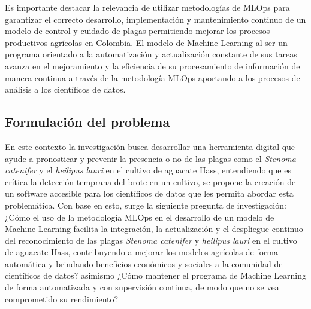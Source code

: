 Es importante destacar la relevancia de utilizar metodologías de MLOps para garantizar el correcto desarrollo, implementación y mantenimiento continuo de un modelo de control y cuidado de plagas permitiendo mejorar los procesos productivos agrícolas en Colombia. El modelo de Machine Learning al ser un programa orientado a la automatización y actualización constante de sus tareas avanza en el mejoramiento y la eficiencia de su procesamiento de información de manera continua a través de la metodología MLOps aportando a los procesos de análisis a los científicos de datos.

\subsection{Formulación del problema}

En este contexto la investigación busca desarrollar una herramienta digital que ayude a pronosticar y prevenir la presencia o no de las plagas como el \textit{Stenoma catenifer} y el \textit{heilipus lauri} en el cultivo de aguacate Hass, entendiendo que es crítica la detección temprana del brote en un cultivo, se propone la creación de un software accesible para los científicos de datos que les permita abordar esta problemática. Con base en esto, surge la siguiente pregunta de investigación: ¿Cómo el uso de la metodología MLOps en el desarrollo de un modelo de Machine Learning facilita la integración, la actualización y el despliegue continuo del reconocimiento de las plagas \textit{Stenoma catenifer} y \textit{heilipus lauri} en el cultivo de aguacate Hass, contribuyendo a mejorar los modelos agrícolas de forma automática y brindando beneficios económicos y sociales a la comunidad de científicos de datos? asimismo ¿Cómo mantener el programa de Machine Learning de forma automatizada y con supervisión continua, de modo que no se vea comprometido su rendimiento?